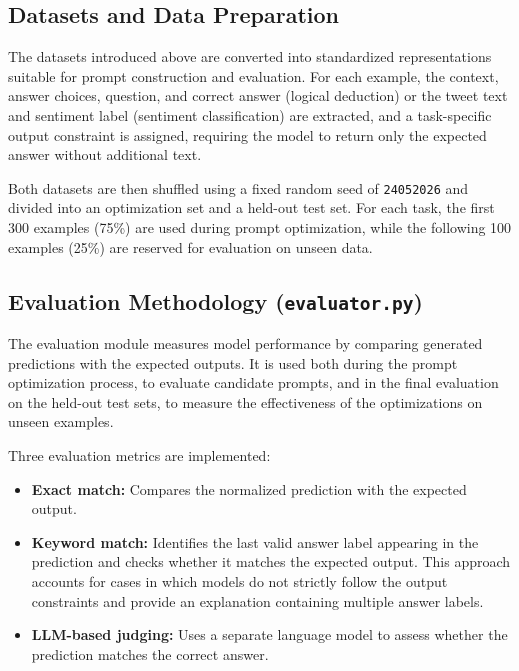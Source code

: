 \documentclass[pdflatex,sn-mathphys-num]{sn-jnl}%
\theoremstyle{thmstyleone}%
\theoremstyle{thmstyletwo}%
\theoremstyle{thmstylethree}%
\begin{document}
\subsection{Datasets and Data Preparation}\label{subsec:datasets}

The datasets introduced above are converted into standardized 
representations suitable for prompt construction and evaluation.
For each example, the context, answer choices, question, and correct 
answer (logical deduction) or the tweet text and sentiment label 
(sentiment classification) are extracted, and a task-specific output 
constraint is assigned, requiring the model to return only the expected 
answer without additional text.

Both datasets are then shuffled using a fixed random seed of 
\texttt{24052026} and divided into an optimization set and a held-out 
test set. For each task, the first 300 examples (75\%) are used during 
prompt optimization, while the following 100 examples (25\%) are reserved 
for evaluation on unseen data.

\subsection{Evaluation Methodology (\texttt{evaluator.py})}

The evaluation module measures model performance by comparing generated
predictions with the expected outputs. It is used both during the prompt
optimization process, to evaluate candidate prompts, and in the final
evaluation on the held-out test sets, to measure the effectiveness of
the optimizations on unseen examples.

Three evaluation metrics are implemented:

\begin{itemize}

    \item \textbf{Exact match:} Compares the normalized prediction with
          the expected output.

    \item \textbf{Keyword match:} Identifies the last valid answer label
          appearing in the prediction and checks whether it matches the
          expected output. This approach accounts for cases in which
          models do not strictly follow the output constraints and
          provide an explanation containing multiple answer labels.

    \item \textbf{LLM-based judging:} Uses a separate language model to
          assess whether the prediction matches the correct answer.

\end{itemize}
\end{document}

